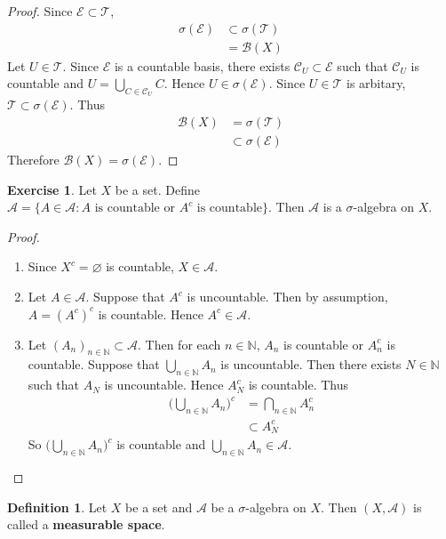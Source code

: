 \documentclass{book}
\theoremstyle{definition}
\newtheorem{defn}[definition]{Definition}
\newtheorem{ex}[definition]{Exercise}
\newcommand{\sig}{\sigma}
\newcommand{\N}{\mathbb{N}}
\newcommand{\MA}{\mathcal{A}}
\newcommand{\MB}{\mathcal{B}}
\newcommand{\MC}{\mathcal{C}}
\newcommand{\ME}{\mathcal{E}}
\newcommand{\MT}{\mathcal{T}}
\newcommand{\lex}[1]{\label{ex:#1}}
\newcommand{\ld}[1]{\label{defn:#1}}
\DeclareMathOperator*{\0}{\mbf{0}}
\DeclareMathOperator*{\1}{\mbf{1}}
\begin{document}
	\begin{proof}
		Since $\ME \subset \MT$, 
		\begin{align*}
			\sig(\ME)
			& \subset \sig(\MT) \\
			& = \MB(X)
		\end{align*}
		Let $U \in \MT$. Since $\ME$ is a countable basis, there exists $\MC_U \subset \ME$ such that $\MC_U$ is countable and $U = \bigcup\limits_{C \in \MC_U}C$. Hence $U \in \sig(\ME)$. Since $U \in \MT$ is arbitary, $\MT \subset \sig(\ME)$. Thus 
		\begin{align*}
			\MB(X) 
			& = \sig(\MT) \\
			& \subset \sig(\ME)
		\end{align*} 
		Therefore $\MB(X) = \sig(\ME)$.
	\end{proof}
	
	\begin{ex} \lex{00000} 
		Let $X$ be a set. Define $\MA = \{A \in \MA: A \text{ is countable or }A^c  \text{ is countable}\}$. Then $\MA$ is a $\sig$-algebra on $X$.
	\end{ex}
	
	\begin{proof}\
		\begin{enumerate}
			\item Since $X^c = \varnothing$ is countable, $X \in \MA$.
			\item Let $A \in \MA$. Suppose that $A^c$ is  uncountable. Then by assumption, $A = (A^c)^c$ is countable. Hence $A^c \in \MA$.
			\item Let $(A_n)_{n \in \N} \subset \MA$. Then for each $n \in \N$, $A_n$ is countable or $A_n^c$ is countable. Suppose that $\bigcup\limits_{n \in \N}A_n$ is uncountable. Then there exists $N \in \N$ such that $A_N$ is uncountable. Hence $A_N^c$ is countable. Thus 
			\begin{align*}
				\bigg(\bigcup_{n \in \N}A_n \bigg)^c 
				&= \bigcap_{n \in \N}A_n^c \\
				& \subset A_N^c 
			\end{align*}
			So $\bigg(\bigcup\limits_{n \in \N}A_n \bigg)^c $ is countable and $\bigcup\limits_{n \in \N}A_n \in \MA$. 
		\end{enumerate}
	\end{proof}


	\begin{defn} \ld{00000} 
		Let $X$ be a set and $\MA$ be a $\sig$-algebra on $X$. Then $(X, \MA)$ is called a \textbf{measurable space}.
	\end{defn}
\end{document}
